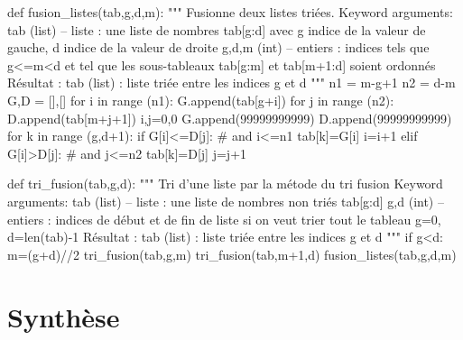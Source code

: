 \documentclass[10pt,fleqn]{article} %
\begin{document}
\begin{py}
\begin{python}
def fusion_listes(tab,g,d,m):
    """
    Fusionne deux listes triées.
    Keyword arguments:
    tab (list) -- liste : une liste de nombres tab[g:d] avec g indice de la 
    valeur de gauche, d indice de la valeur de droite
    g,d,m (int) -- entiers : indices tels que g<=m<d et tel que les 
    sous-tableaux tab[g:m] et tab[m+1:d] soient ordonnés
    Résultat :
    tab (list) : liste triée entre les indices g et d
    """
    n1 = m-g+1
    n2 = d-m
    G,D = [],[]
    for i in range (n1):
        G.append(tab[g+i])
    for j in range (n2):
        D.append(tab[m+j+1])
    i,j=0,0
    G.append(99999999999)
    D.append(99999999999)
    for k in range (g,d+1):
        if G[i]<=D[j]: # and i<=n1 
            tab[k]=G[i]
            i=i+1
        elif G[i]>D[j]: # and j<=n2
            tab[k]=D[j]
            j=j+1
            
def tri_fusion(tab,g,d):
    """
    Tri d'une liste par la métode du tri fusion
    Keyword arguments:
    tab (list) -- liste : une liste de nombres non triés tab[g:d]
    g,d (int) -- entiers : indices de début et de fin de liste si on veut trier
                           tout le tableau g=0, d=len(tab)-1
    Résultat :
    tab (list) : liste triée entre les indices g et d
    """
    if g<d:
        m=(g+d)//2
        tri_fusion(tab,g,m)
        tri_fusion(tab,m+1,d)
        fusion_listes(tab,g,d,m)
\end{python}
\end{py}



\section{Synthèse}

\begin{thebibliography}{2}

\end{thebibliography}
\end{document}
